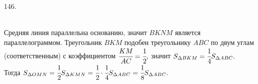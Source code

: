 146. \begin{figure}[ht!]
\end{figure}\\
Средняя линия параллельна основанию, значит $BKNM$ является параллелограммом. Треугольник $BKM$ подобен треугольнику $ABC$ по двум углам (соответственным) с коэффициентом $\cfrac{KM}{AC}=\cfrac{1}{2},$ значит $S_{\Delta BKM}=\cfrac{1}{4}S_{\Delta ABC}.$ Тогда $S_{\Delta OMN}=\cfrac{1}{2}S_{\Delta KMN}=\cfrac{1}{2}\cdot\cfrac{1}{4}S_{\Delta ABC}=\cfrac{1}{8}S_{\Delta ABC}.$\\
